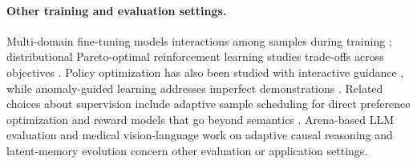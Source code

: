 \paragraph{Other training and evaluation settings.} Multi-domain fine-tuning
models interactions among samples during training \citep{liang2025boosting};
distributional Pareto-optimal reinforcement learning studies trade-offs across
objectives \citep{NEURIPS2023_32285dd1}. Policy optimization has also been
studied with interactive guidance
\citep{liu2026socraticpopolicyoptimizationinteractive}, while anomaly-guided
learning addresses imperfect demonstrations \citep{AAMAS'22:AGPO}. Related
choices about supervision include adaptive sample scheduling for direct
preference optimization \citep{huang2025adaptive} and reward models that go
beyond semantics \citep{Huang2026RealTimeAR}. Arena-based LLM evaluation
\citep{liu2025elo} and medical vision-language work on adaptive causal
reasoning \citep{lin2026models} and latent-memory evolution
\citep{zhu2026medsynapsevbridgingvisualperception} concern other evaluation or
application settings.
